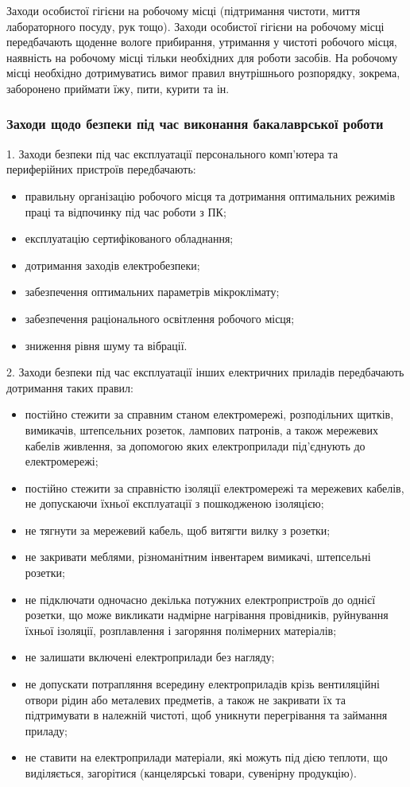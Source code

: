 \documentclass[12pt,a4paper]{article}
\begin{document}
Заходи особистої гігієни на робочому місці (підтримання чистоти, миття лабораторного посуду, рук тощо).
Заходи особистої гігієни на робочому місці передбачають щоденне вологе прибирання, утримання у чистоті робочого місця, наявність на робочому місці тільки необхідних для роботи засобів. На робочому місці необхідно дотримуватись вимог правил внутрішнього розпорядку, зокрема, заборонено приймати їжу, пити, курити та ін.

\subsubsection{Заходи щодо безпеки під час виконання бакалаврської роботи}
1.	Заходи безпеки під час експлуатації персонального комп’ютера та периферійних пристроїв передбачають:
\begin{itemize}
\item	правильну організацію робочого місця та дотримання оптимальних режимів праці та відпочинку під час роботи з ПК;
\item	експлуатацію сертифікованого обладнання;
\item	дотримання заходів електробезпеки;
\item	забезпечення оптимальних параметрів мікроклімату;
\item	забезпечення  раціонального освітлення робочого місця;
\item	зниження рівня шуму та вібрації.
\end{itemize}
2.	Заходи безпеки під час експлуатації інших електричних приладів передбачають дотримання таких правил:
\begin{itemize}
\item	постійно стежити за справним станом електромережі, розподільних щитків, вимикачів, штепсельних розеток, лампових патронів, а також мережевих кабелів живлення, за допомогою яких електроприлади під’єднують до електромережі;
\item	постійно  стежити за справністю ізоляції електромережі та мережевих кабелів, не допускаючи їхньої експлуатації з пошкодженою ізоляцією;
\item	не тягнути за мережевий кабель, щоб витягти вилку з розетки;
\item	не закривати меблями, різноманітним інвентарем вимикачі, штепсельні розетки; 
\item	не підключати одночасно декілька потужних електропристроїв до однієї розетки, що може викликати надмірне нагрівання провідників, руйнування їхньої ізоляції, розплавлення і загоряння полімерних матеріалів;
\item	не залишати включені електроприлади без нагляду; 
\item	не допускати потрапляння всередину електроприладів крізь вентиляційні отвори  рідин або металевих предметів, а також не закривати їх та підтримувати в належній чистоті, щоб уникнути перегрівання та займання приладу;
\item	не ставити на електроприлади матеріали, які можуть під дією теплоти, що виділяється, загорітися (канцелярські товари, сувенірну продукцію).
\end{itemize}
\end{document}
